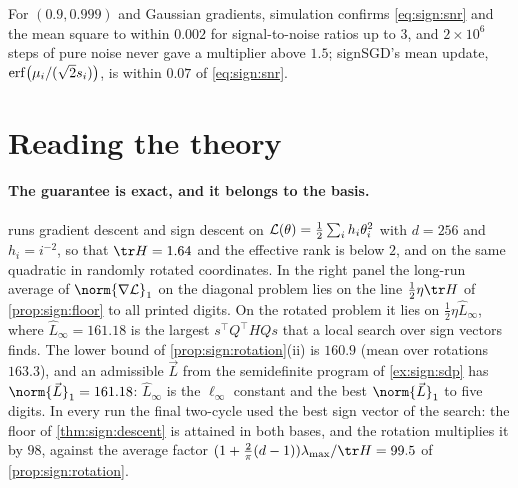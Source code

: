 \begin{refsection}
For $(0.9,0.999)$ and Gaussian gradients, simulation confirms \eqref{eq:sign:snr} and the mean square to within $0.002$ for signal-to-noise ratios up to $3$, and $2\times10^6$ steps of pure noise never gave a multiplier above $1.5$; signSGD's mean update, $\operatorname{erf}\bigl(\mu_i/(\sqrt2s_i)\bigr)$, is within $0.07$ of \eqref{eq:sign:snr}.

\section{Reading the theory}\label{sec:sign:reading}

\paragraph{The guarantee is exact, and it belongs to the basis.}  runs gradient descent and sign descent on $\mathcal{L}(\theta)=\frac12\sum_ih_i\theta_i^2$ with $d=256$ and $h_i=i^{-2}$, so that $\tr H=1.64$ and the effective rank is below $2$, and on the same quadratic in randomly rotated coordinates. In the right panel the long-run average of $\norm{\nabla\Loss}_1$ on the diagonal problem lies on the line $\frac12\eta\tr H$ of \cref{prop:sign:floor} to all printed digits. On the rotated problem it lies on $\frac12\eta\hat L_\infty$, where $\hat L_\infty=161.18$ is the largest $s^\top Q^\top HQs$ that a local search over sign vectors finds. The lower bound of \cref{prop:sign:rotation}(ii) is $160.9$ (mean over rotations $163.3$), and an admissible $\vec L$ from the semidefinite program of \cref{ex:sign:sdp} has $\norm{\vec L}_1=161.18$: $\hat L_\infty$ is the $\ell_\infty$ constant and the best $\norm{\vec L}_1$ to five digits. In every run the final two-cycle used the best sign vector of the search: the floor of \cref{thm:sign:descent} is attained in both bases, and the rotation multiplies it by $98$, against the average factor $(1+\frac2\pi(d-1))\lmax/\tr H=99.5$ of \cref{prop:sign:rotation}.


\end{refsection}
